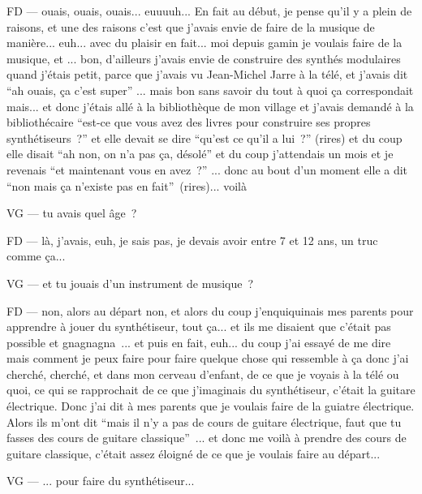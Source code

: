 FD — ouais, ouais, ouais... euuuuh... En fait au début, je pense qu'il y a plein de raisons, et une des raisons c'est que j'avais envie de faire de la musique de manière... euh... avec du plaisir en fait... moi depuis gamin je voulais faire de la musique, et ... bon, d'ailleurs j'avais envie de construire des synthés modulaires quand j'étais petit, parce que j'avais vu Jean-Michel Jarre à la télé, et j'avais dit ``ah ouais, ça c'est super'' ... mais bon sans savoir du tout à quoi ça correspondait mais... et donc j'étais allé à la bibliothèque de mon village et j'avais demandé à la bibliothécaire ``est-ce que vous avez des livres pour construire ses propres synthétiseurs ?'' et elle devait se dire ``qu'est ce qu'il a lui ?'' (rires) et du coup elle disait ``ah non, on n'a pas ça, désolé'' et du coup j'attendais un mois et je revenais ``et maintenant vous en avez ?'' ... donc au bout d'un moment elle a dit ``non mais ça n'existe pas en fait'' (rires)... voilà 

VG — tu avais quel âge ? 

FD — là, j'avais, euh, je sais pas, je devais avoir entre 7 et 12 ans, un truc comme ça... 

VG — et tu jouais d'un instrument de musique ? 

FD — non, alors au départ non, et alors du coup j'enquiquinais mes parents pour apprendre à jouer du synthétiseur, tout ça... et ils me disaient que c'était pas possible et gnagnagna ... et puis en fait, euh... du coup j'ai essayé de me dire mais comment je peux faire pour faire quelque chose qui ressemble à ça donc j'ai cherché, cherché, et dans mon cerveau d'enfant, de ce que je voyais à la télé ou quoi, ce qui se rapprochait de ce que j'imaginais du synthétiseur, c'était la guitare électrique. Donc j'ai dit à mes parents que je voulais faire de la guiatre électrique. Alors ils m'ont dit ``mais il n'y a pas de cours de guitare électrique, faut que tu fasses des cours de guitare classique'' ... et donc me voilà à prendre des cours de guitare classique, c'était assez éloigné de ce que je voulais faire au départ... 

VG — ... pour faire du synthétiseur... 

